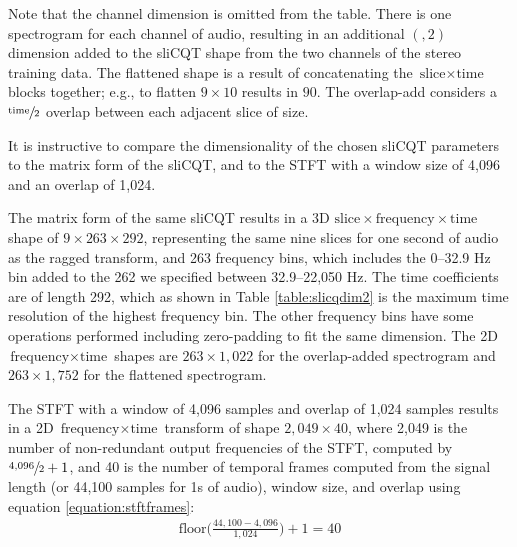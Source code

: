 \documentclass[report.tex]{subfiles}
\begin{document}
Note that the channel dimension is omitted from the table. There is one spectrogram for each channel of audio, resulting in an additional $(, 2)$ dimension added to the sliCQT shape from the two channels of the stereo training data. The flattened shape is a result of concatenating the $\text{slice} \times \text{time}$ blocks together; e.g., to flatten $9 \times 10$ results in $90$. The overlap-add considers a $\sfrac{\text{time}}{2}$ overlap between each adjacent slice of size.

It is instructive to compare the dimensionality of the chosen sliCQT parameters to the matrix form of the sliCQT, and to the STFT with a window size of 4,096 and an overlap of 1,024.

The matrix form of the same sliCQT results in a 3D $\text{slice} \times \text{frequency} \times \text{time}$ shape of $9 \times 263 \times 292$, representing the same nine slices for one second of audio as the ragged transform, and 263 frequency bins, which includes the 0--32.9 Hz bin added to the 262 we specified between 32.9--22,050 Hz. The time coefficients are of length 292, which as shown in Table \ref{table:slicqdim2} is the maximum time resolution of the highest frequency bin. The other frequency bins have some operations performed including zero-padding to fit the same dimension. The 2D $\text{frequency} \times \text{time}$ shapes are $263 \times 1{,}022$ for the overlap-added spectrogram and $263 \times 1{,}752$ for the flattened spectrogram.

The STFT with a window of 4,096 samples and overlap of 1,024 samples results in a 2D $\text{frequency} \times \text{time}$ transform of shape $2{,}049 \times 40$, where 2,049 is the number of non-redundant output frequencies of the STFT, computed by $\sfrac{4{,}096}{2} + 1$, and 40 is the number of temporal frames computed from the signal length (or 44,100 samples for 1s of audio), window size, and overlap using equation \ref{equation:stftframes}:
\begin{align}
	\text{floor}\big(\frac{44{,}100-4{,}096}{1{,}024}\big) + 1 = 40\tag{37}\label{equation:stftframes}
\end{align}
\end{document}
